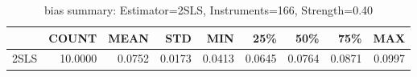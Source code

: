 \begin{table}[ht]
\centering
\caption{bias summary: Estimator=2SLS, Instruments=166, Strength=0.40}
\begin{tabular}{lrrrrrrrr}
\toprule
 & COUNT & MEAN & STD & MIN & 25\% & 50\% & 75\% & MAX \\
\midrule
2SLS & 10.0000 & 0.0752 & 0.0173 & 0.0413 & 0.0645 & 0.0764 & 0.0871 & 0.0997 \\
\bottomrule
\end{tabular}
\end{table}
